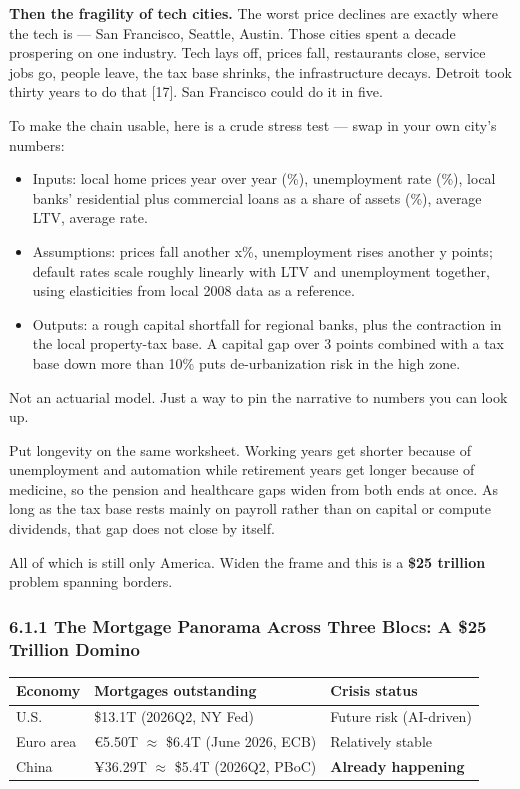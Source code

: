 \documentclass[11pt,a4paper]{article}
\begin{document}
\textbf{Then the fragility of tech cities.} The worst price declines are exactly where the tech is --- San Francisco, Seattle, Austin. Those cities spent a decade prospering on one industry. Tech lays off, prices fall, restaurants close, service jobs go, people leave, the tax base shrinks, the infrastructure decays. Detroit took thirty years to do that [17]. San Francisco could do it in five.

To make the chain usable, here is a crude stress test --- swap in your own city's numbers:

\begin{itemize}
  \item Inputs: local home prices year over year (\%), unemployment rate (\%), local banks' residential plus commercial loans as a share of assets (\%), average LTV, average rate.
  \item Assumptions: prices fall another x\%, unemployment rises another y points; default rates scale roughly linearly with LTV and unemployment together, using elasticities from local 2008 data as a reference.
  \item Outputs: a rough capital shortfall for regional banks, plus the contraction in the local property-tax base. A capital gap over 3 points combined with a tax base down more than 10\% puts de-urbanization risk in the high zone.
\end{itemize}

Not an actuarial model. Just a way to pin the narrative to numbers you can look up.

Put longevity on the same worksheet. Working years get shorter because of unemployment and automation while retirement years get longer because of medicine, so the pension and healthcare gaps widen from both ends at once. As long as the tax base rests mainly on payroll rather than on capital or compute dividends, that gap does not close by itself.

All of which is still only America. Widen the frame and this is a \textbf{\$25 trillion} problem spanning borders.

\subsubsection{6.1.1 The Mortgage Panorama Across Three Blocs: A \$25 Trillion Domino}

\begin{center}

\begin{tabularx}{\textwidth}{lXX}
\toprule
Economy & Mortgages outstanding & Crisis status \\
\midrule
U.S. & \$13.1T (2026Q2, NY Fed) & Future risk (AI-driven) \\
Euro area & €5.50T $\approx$ \$6.4T (June 2026, ECB) & Relatively stable \\
China & ¥36.29T $\approx$ \$5.4T (2026Q2, PBoC) & \textbf{Already happening} \\
\bottomrule
\end{tabularx}
\end{center}
\end{document}
